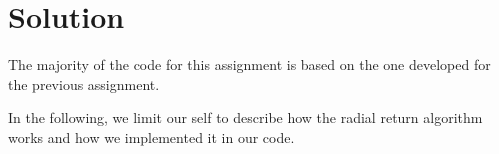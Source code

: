 \section{Solution}
\label{sec:solution}

The majority of the code for this assignment is based on the one developed for the previous assignment.

In the following, we limit our self to describe how the radial return algorithm works and how we implemented it in our code.



